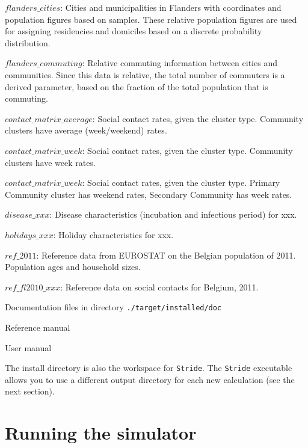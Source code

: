 \begin{compactitem}
\begin{compactitem}
        	\item $flanders\_cities$: Cities and municipalities in Flanders with coordinates and population figures based on samples. These relative population figures are used for assigning residencies and domiciles based on a discrete probability distribution.
        	\item $flanders\_commuting$: Relative commuting information between cities and communities. Since this data is relative, the total number of commuters is a derived parameter, based on the fraction of the total population that is commuting.
			\item $contact\_matrix\_average$: Social contact rates, given the cluster type. Community clusters have average (week/weekend) rates.
			\item $contact\_matrix\_week$: Social contact rates, given the cluster type. Community clusters have week rates.
			\item $contact\_matrix\_week$: Social contact rates, given the cluster type. Primary Community cluster has weekend rates, Secondary Community has week rates.
			\item $disease\_xxx$: Disease characteristics (incubation and infectious period) for xxx.
			\item $holidays\_xxx$: Holiday characteristics for xxx.
			\item $ref\_2011$: Reference data from EUROSTAT on the Belgian population of 2011. Population ages and household sizes.
			\item $ref\_fl2010\_xxx$: Reference data on social contacts for Belgium, 2011.
        \end{compactitem}
%
    \item Documentation files in directory \texttt{./target/installed/doc}
      	\begin{compactitem}
        			\item Reference manual
        			\item User manual
        \end{compactitem}
%
\end{compactitem}

The install directory is also the workspace for \texttt{Stride}. The \texttt{Stride} executable allows you to use a different output directory for each new calculation (see the next section).

\newpage
\section{Running the simulator}

